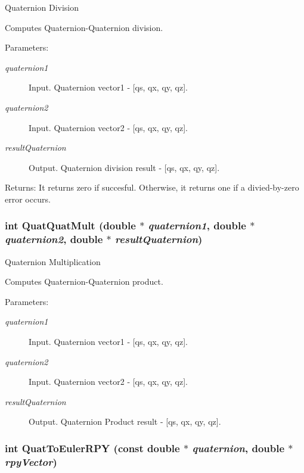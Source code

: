 Quaternion Division 

Computes Quaternion-Quaternion division.

\begin{Desc}
\item[Parameters:]
\begin{description}
\item[{\em quaternion1}]Input. Quaternion vector1 - \mbox{[}qs, qx, qy, qz\mbox{]}. \item[{\em quaternion2}]Input. Quaternion vector2 - \mbox{[}qs, qx, qy, qz\mbox{]}. \item[{\em resultQuaternion}]Output. Quaternion division result - \mbox{[}qs, qx, qy, qz\mbox{]}.\end{description}
\end{Desc}
\begin{Desc}
\item[Returns:]It returns zero if succesful. Otherwise, it returns one if a divied-by-zero error occurs. \end{Desc}
\hypertarget{group__quaternion_g72107735baae1beaa708201db02c785d}{
\subsubsection[QuatQuatMult]{\setlength{\rightskip}{0pt plus 5cm}int QuatQuatMult (double $\ast$ {\em quaternion1}, \/  double $\ast$ {\em quaternion2}, \/  double $\ast$ {\em resultQuaternion})}}
\label{group__quaternion_g72107735baae1beaa708201db02c785d}


Quaternion Multiplication 

Computes Quaternion-Quaternion product.

\begin{Desc}
\item[Parameters:]
\begin{description}
\item[{\em quaternion1}]Input. Quaternion vector1 - \mbox{[}qs, qx, qy, qz\mbox{]}. \item[{\em quaternion2}]Input. Quaternion vector2 - \mbox{[}qs, qx, qy, qz\mbox{]}. \item[{\em resultQuaternion}]Output. Quaternion Product result - \mbox{[}qs, qx, qy, qz\mbox{]}. \end{description}
\end{Desc}
\hypertarget{group__quaternion_g77ac8a89edcac95acc7b2d72c199887e}{
\subsubsection[QuatToEulerRPY]{\setlength{\rightskip}{0pt plus 5cm}int QuatToEulerRPY (const double $\ast$ {\em quaternion}, \/  double $\ast$ {\em rpyVector})}}
\label{group__quaternion_g77ac8a89edcac95acc7b2d72c199887e}


